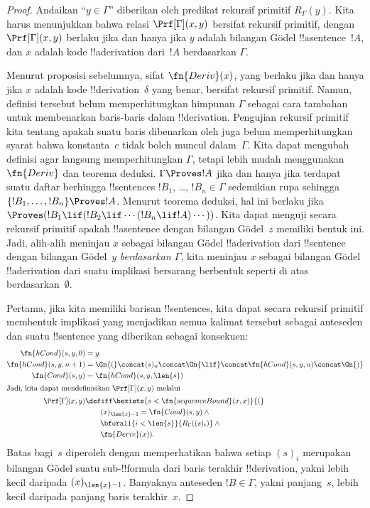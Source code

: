 \documentclass[../../../include/open-logic-section]{subfiles}
\begin{document}
\begin{proof}
Andaikan ``$y \in \Gamma$'' diberikan oleh predikat rekursif primitif
$R_\Gamma(y)$. Kita harus menunjukkan bahwa relasi $\Prf[\Gamma](x, y)$
bersifat rekursif primitif, dengan $\Prf[\Gamma](x, y)$ berlaku jika dan hanya
jika $y$ adalah bilangan G\"odel !!a{sentence}~$!A$, dan $x$ adalah kode
!!a{derivation} dari~$!A$ berdasarkan $\Gamma$.

Menurut proposisi sebelumnya, sifat $\fn{Deriv}(x)$, yang berlaku jika dan hanya
jika $x$ adalah kode !!{derivation}~$\delta$ yang benar, bersifat rekursif
primitif. Namun, definisi tersebut belum memperhitungkan himpunan $\Gamma$
sebagai cara tambahan untuk membenarkan baris-baris dalam !!{derivation}.
Pengujian rekursif primitif kita tentang apakah suatu baris dibenarkan oleh
\QR{} juga belum memperhitungkan syarat bahwa konstanta~$c$ tidak boleh muncul
dalam~$\Gamma$. Kita dapat mengubah definisi agar langsung memperhitungkan
$\Gamma$, tetapi lebih mudah menggunakan $\fn{Deriv}$ dan teorema deduksi.
$\Gamma \Proves !A$ jika dan hanya jika terdapat suatu daftar berhingga
!!{sentence}s $!B_1$, \dots, $!B_n \in \Gamma$ sedemikian rupa sehingga
$\{!B_1, \dots, !B_n\} \Proves !A$. Menurut teorema deduksi, hal ini berlaku
jika $\Proves (!B_1 \lif (!B_2 \lif \cdots (!B_n \lif !A)\cdots))$. Kita
dapat menguji secara rekursif primitif apakah !!a{sentence} dengan bilangan
G\"odel~$z$ memiliki bentuk ini. Jadi, alih-alih meninjau $x$ sebagai bilangan
G\"odel !!a{derivation} dari !!{sentence} dengan bilangan G\"odel~$y$
\emph{berdasarkan $\Gamma$}, kita meninjau $x$ sebagai bilangan G\"odel
!!a{derivation} dari suatu implikasi bersarang berbentuk seperti di atas
berdasarkan~$\emptyset$.

Pertama, jika kita memiliki barisan !!{sentence}s, kita dapat secara rekursif
primitif membentuk implikasi yang menjadikan semua kalimat tersebut sebagai
anteseden dan suatu !!{sentence} yang diberikan sebagai konsekuen:
\begin{align*}
  \fn{hCond}(s, y, 0) & = y \\
  \fn{hCond}(s, y, n+1) & = \Gn{(} \concat (s)_{n} \concat \Gn{\lif}
  \concat \fn{hCond}(s, y, n) \concat \Gn{)}\\
  \fn{Cond}(s, y) & = \fn{hCond}(s, y, \len{s})\\
  \intertext{Jadi, kita dapat mendefinisikan $\Prf[\Gamma](x, y)$ melalui}
  \Prf[\Gamma](x, y) & \defiff \bexists{s < \fn{sequenceBound}(x,x)}{(} \\
  &\qquad (x)_{\len{x}-1} = \fn{Cond}(s,y) \land {} \\
  &\qquad\bforall{i<\len{s}}{R_\Gamma((s)_i)} \land {} \\
  &\qquad\fn{Deriv}(x)).
\end{align*}
Batas bagi~$s$ diperoleh dengan memperhatikan bahwa setiap $(s)_i$ merupakan
bilangan G\"odel suatu sub-!!{formula} dari baris terakhir !!{derivation},
yakni lebih kecil daripada $(x)_{\len{x}-1}$. Banyaknya anteseden
$!B \in \Gamma$, yakni panjang~$s$, lebih kecil daripada panjang baris
terakhir~$x$.
\end{proof}
\end{document}
